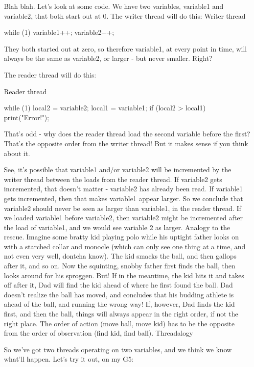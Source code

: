 Blah blah. Let's look at some code. We have two variables, variable1 and variable2, that both start out at 0. The writer thread will do this:
Writer thread

while (1) {
   variable1++;
   variable2++;
}

They both started out at zero, so therefore variable1, at every point in time, will always be the same as variable2, or larger - but never smaller. Right?

The reader thread will do this:

Reader thread

while (1) {
   local2 = variable2;
   local1 = variable1;
   if (local2 > local1) {
      print("Error!");
   }
}

That's odd - why does the reader thread load the second variable before the first? That's the opposite order from the writer thread! But it makes sense if you think about it.

See, it's possible that variable1 and/or variable2 will be incremented by the writer thread between the loads from the reader thread. If variable2 gets incremented, that doesn't matter - variable2 has already been read. If variable1 gets incremented, then that makes variable1 appear larger. So we conclude that variable2 should never be seen as larger than variable1, in the reader thread. If we loaded variable1 before variable2, then variable2 might be incremented after the load of variable1, and we would see variable 2 as larger. 
Analogy to the rescue. Imagine some bratty kid playing polo while his uptight father looks on with a starched collar and monocle (which can only see one thing at a time, and not even very well, dontcha know). The kid smacks the ball, and then gallops after it, and so on. Now the squinting, snobby father first finds the ball, then looks around for his sproggen. But! If in the meantime, the kid hits it and takes off after it, Dad will find the kid ahead of where he first found the ball. Dad doesn't realize the ball has moved, and concludes that his budding athlete is ahead of the ball, and running the wrong way! If, however, Dad finds the kid first, and then the ball, things will always appear in the right order, if not the right place. The order of action (move ball, move kid) has to be the opposite from the order of observation (find kid, find ball).
Threadalogy

So we've got two threads operating on two variables, and we think we know what'll happen. Let's try it out, on my G5:

